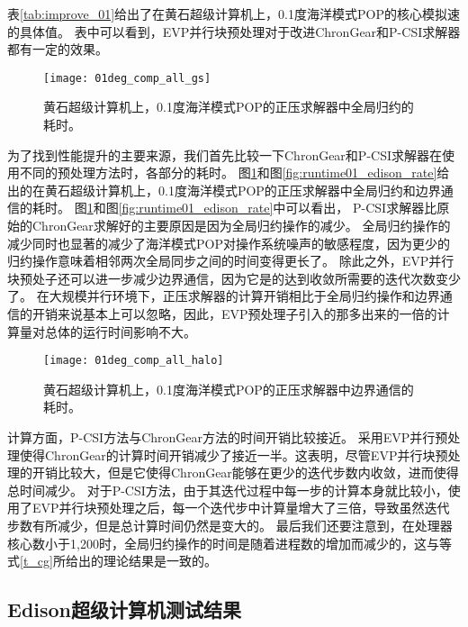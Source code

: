表\ref{tab:improve_01}给出了在黄石超级计算机上，0.1度海洋模式POP的核心模拟速的具体值。
表中可以看到，EVP并行块预处理对于改进ChronGear和P-CSI求解器都有一定的效果。



\begin {figure} 
\begin{center}
\texttt{[image: 01deg\_comp\_all\_gs]}
\end{center}
\caption[] {黄石超级计算机上，0.1度海洋模式POP的正压求解器中全局归约的耗时。}
\label{fig:component_gs}
\end {figure}

为了找到性能提升的主要来源，我们首先比较一下ChronGear和P-CSI求解器在使用不同的预处理方法时，各部分的耗时。 
图\ref{fig:component_gs}和图\ref{fig:runtime01_edison_rate}给出的在黄石超级计算机上，0.1度海洋模式POP的正压求解器中全局归约和边界通信的耗时。 
图\ref{fig:component_gs}和图\ref{fig:runtime01_edison_rate}中可以看出， P-CSI求解器比原始的ChronGear求解好的主要原因是因为全局归约操作的减少。 
全局归约操作的减少同时也显著的减少了海洋模式POP对操作系统噪声的敏感程度\cite{ferreira}，因为更少的归约操作意味着相邻两次全局同步之间的时间变得更长了。 
除此之外，EVP并行块预处子还可以进一步减少边界通信，因为它是的达到收敛所需要的迭代次数变少了。 
在大规模并行环境下，正压求解器的计算开销相比于全局归约操作和边界通信的开销来说基本上可以忽略，因此，EVP预处理子引入的那多出来的一倍的计算量对总体的运行时间影响不大。

\begin {figure} 
\begin{center}
\texttt{[image: 01deg\_comp\_all\_halo]}
\end{center}
\caption[] {黄石超级计算机上，0.1度海洋模式POP的正压求解器中边界通信的耗时。}
\label{fig:component_halo}
\end {figure}
计算方面，P-CSI方法与ChronGear方法的时间开销比较接近。 
采用EVP并行预处理使得ChronGear的计算时间开销减少了接近一半。这表明，尽管EVP并行块预处理的开销比较大，但是它使得ChronGear能够在更少的迭代步数内收敛，进而使得总时间减少。 
对于P-CSI方法，由于其迭代过程中每一步的计算本身就比较小，使用了EVP并行块预处理之后，每一个迭代步中计算量增大了三倍，导致虽然迭代步数有所减少，但是总计算时间仍然是变大的。
最后我们还要注意到，在处理器核心数小于1,200时，全局归约操作的时间是随着进程数的增加而减少的，这与等式\ref{t_cg}所给出的理论结果是一致的。



\subsection{Edison超级计算机测试结果}
\label{precond:exp:Edison}

